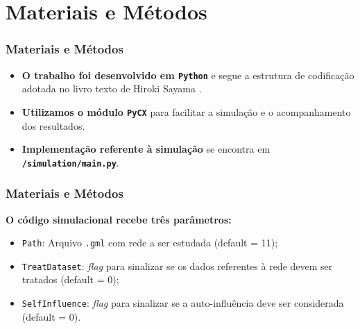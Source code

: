 
\section{Materiais e Métodos}

\begin{frame}
  \frametitle{Materiais e Métodos}

  \begin{alertblock}{}
    \vspace{5mm}

    \begin{itemize}
      \item \alert{\textbf{O trabalho foi desenvolvido em \texttt{Python}}} e
        segue a estrutura de codificação adotada no livro texto de Hiroki Sayama
        \cite{Sayama:2015:ComplexSystems}.
      \vspace{5mm}

      \item \alert{\textbf{Utilizamos o módulo \texttt{PyCX}}} para facilitar
        a simulação e o acompanhamento dos resultados.
      \vspace{5mm}

      \item \textbf{Implementação referente à simulação} se encontra em
        \textbf{\texttt{/simulation/main.py}}.
      \vspace{5mm}

    \end{itemize}
  \end{alertblock}
\end{frame}

\begin{frame}
  \frametitle{Materiais e Métodos}

  \textbf{O código simulacional recebe três parâmetros:}

  \begin{alertblock}{}
    \vspace{5mm}

    \begin{itemize}
      \item \texttt{Path}: Arquivo \texttt{.gml} com rede a ser estudada
        (default = 11);
      \vspace{5mm}

      \item \texttt{TreatDataset}: \textit{flag} para sinalizar se os dados
        referentes à rede devem ser tratados (default = 0);
      \vspace{5mm}

      \item \texttt{SelfInfluence}: \textit{flag} para sinalizar se a
        auto-influência deve ser considerada (default = 0).
      \vspace{5mm}

    \end{itemize}
  \end{alertblock}
\end{frame}

